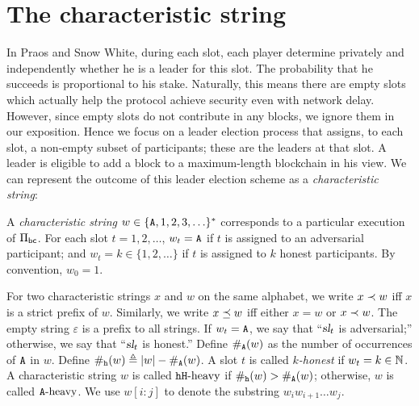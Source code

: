 \section{The characteristic string}
In Praos and Snow White, 
during each slot, 
each player determine privately and independently 
whether he is a leader for this slot. 
The probability that he succeeds is proportional to his stake. 
Naturally, this means there are empty slots 
which actually help the protocol achieve 
security even with network delay. 
However, since empty slots do not contribute in any blocks, 
we ignore them in our exposition. 
Hence we focus on a leader election process that assigns, 
to each slot, 
a non-empty subset of participants; 
these are the leaders at that slot. 
A leader is eligible to add a block to a 
maximum-length blockchain in his view. 
We can represent the outcome of this leader election scheme 
as a \emph{characteristic string}:


\begin{definition}\label{def:char-string}
  A \emph{characteristic string} $w \in \{\mathtt{A}, 1, 2, 3, \ldots \}^*$ 
  corresponds to a particular execution of $\Pi_\mathsf{bc}$.
  For each slot $t = 1, 2, \ldots$, 
  $w_t = \mathtt{A}$ if $t$ is assigned to an adversarial participant; and 
  $w_t = k \in \{1,2,\ldots\}$ if $t$ is assigned to $k$ honest participants.
  By convention, $w_0 = 1$.
\end{definition}

For two characteristic strings $x$ and $w$ on the same alphabet, 
we write $x \prec w$ iff $x$ is a strict prefix of $w$. 
Similarly, 
we write $x \preceq w$ iff either $x = w$ or $x \prec w$. 
The empty string $\varepsilon$ is a prefix to all strings. 
If $w_t = \mathtt{A}$, we say that ``$\textsl{sl}_t$ is adversarial;'' 
otherwise, we say that ``$\textsl{sl}_t$ is honest.'' 
Define $\#_{\mathtt{A}}(w)$ as the number of occurrences of $\mathtt{A}$ in $w$. 
Define $\#_{\mathtt{h}}(w) \triangleq |w| - \#_{\mathtt{A}}(w)$.
A slot $t$ is called \emph{$k$-honest} if $w_t = k \in \mathbb{N}$.
A characteristic string $w$ is called $\mathtt{h}\mathtt{H}\text{-heavy}$ if 
$\#_{\mathtt{h}}(w) > \#_{\mathtt{A}}(w)$; 
otherwise, $w$ is called $\mathtt{A}\text{-heavy}$. 
We use $w[i : j]$ to denote the substring $w_i w_{i+1}\ldots w_j$.








